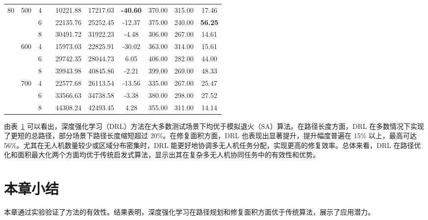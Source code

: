 \documentclass[AutoFakeBold]{LZUThesis}
\begin{document}
\begin{table}[H]
\begin{tabular}{cccc ccc ccc}
		\multirow{9}{*}{80} & \multirow{3}{*}{500} & 4    &  & 10221.88                 & 17217.03                 & \textbf{-40.60}  & 370.00 & 315.00 & 17.46   \\
							&                      & 6    &  & 22135.76                 & 25252.45                 & -12.37  & 375.00 & 240.00 & \textbf{56.25}   \\
							&                      & 8    &  & 30491.72                 & 31922.23                 & -4.48   & 306.00 & 267.00 & 14.61   \\
		\cmidrule(lr){2-10}
							& \multirow{3}{*}{600} & 4    &  & 15973.03                 & 22825.91                 & -30.02  & 363.00 & 314.00 & 15.61   \\
							&                      & 6    &  & 29742.35                 & 28044.73                 & 6.05    & 406.00 & 282.00 & 44.00   \\
							&                      & 8    &  & 39943.98                 & 40845.86                 & -2.21   & 399.00 & 269.00 & 48.33   \\
		\cmidrule(lr){2-10}
							& \multirow{3}{*}{700} & 4    &  & 22577.68                 & 26113.54                 & -13.56  & 335.00 & 267.00 & 25.47   \\
							&                      & 6    &  & 33566.63                 & 34738.58                 & -3.38   & 380.00 & 298.00 & 27.52   \\
							&                      & 8    &  & 44308.24                 & 42493.45                 & 4.28    & 355.00 & 311.00 & 14.14   \\
		\bottomrule
	\end{tabular}
	\label{tab:combined_comparison}
\end{table}

由表~\ref{tab:combined_comparison} 可以看出，深度强化学习（DRL）方法在大多数测试场景下均优于模拟退火（SA）算法。在路径长度方面，DRL 在多数情况下实现了更短的总路径，部分场景下路径长度缩短超过 20\%。在修复面积方面，DRL 也表现出显著提升，提升幅度普遍在 15\% 以上，最高可达 56\%。尤其在无人机数量较少或区域分布密集时，DRL 能更好地协调多无人机任务分配，实现更高的修复效率。总体来看，DRL 在路径优化和面积最大化两个方面均优于传统启发式算法，显示出其在复杂多无人机协同任务中的有效性和优势。


\section{本章小结}
本章通过实验验证了方法的有效性。结果表明，深度强化学习在路径规划和修复面积方面优于传统算法，展示了应用潜力。
\end{document}

